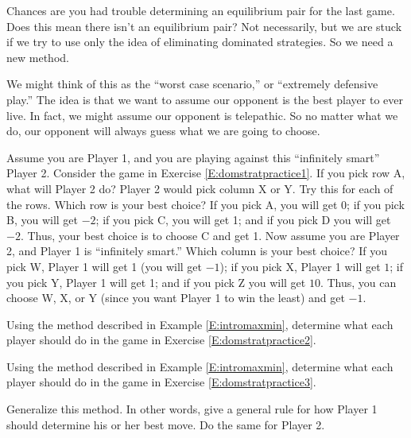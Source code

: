 Chances are you had trouble determining an equilibrium pair for the last game. Does this mean there isn't an equilibrium pair? Not necessarily, but we are stuck if we try to use only the idea of eliminating dominated strategies. So we need a new method. 

We might think of this as the ``worst case scenario,'' or ``extremely defensive play.'' The idea is that we want to assume our opponent is the best player to ever live. In fact, we might assume our opponent is telepathic. So no matter what we do, our opponent will always guess what we are going to choose. 

\begin{example}\label{E:intromaxmin}
Assume you are Player 1, and you are playing against this ``infinitely smart'' Player 2. Consider the game in Exercise \ref{E:domstratpractice1}. If you pick row A, what will Player 2 do? Player 2 would pick column X or Y. Try this for each of the rows. Which row is your best choice? If you pick A, you will get 0; if you pick B, you will get $-2$; if you pick C, you will get 1; and if you pick D you will get $-2$. Thus, your best choice is to choose C and get 1. Now assume you are Player 2, and Player 1 is ``infinitely smart.'' Which column is your best choice? If you pick W, Player 1 will get 1 (you will get $-1$); if you pick X, Player 1 will get $1$; if you pick Y, Player 1 will get 1; and if you pick Z you will get $10$. Thus, you can choose W, X, or Y (since you want Player 1 to win the least) and get $-1$.
\end{example}

\begin{xca}
Using the method described in Example \ref{E:intromaxmin}, determine what each player should do in the game in Exercise \ref{E:domstratpractice2}.
\end{xca}



\begin{xca}
Using the method described in Example \ref{E:intromaxmin}, determine what each player should do in the game in Exercise \ref{E:domstratpractice3}.
\end{xca}

\begin{xca}
Generalize this method. In other words, give a general rule for how Player 1 should determine his or her best move. Do the same for Player 2.
\end{xca}



